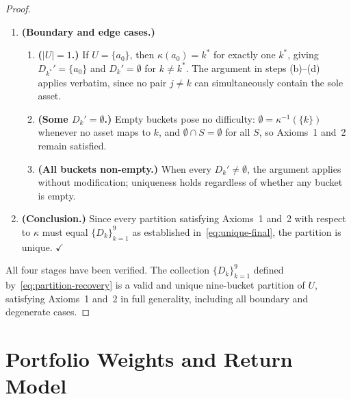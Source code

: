 \documentclass[12pt,openany]{book}
\newcommand{\calU}{\mathcal{U}}
\newcommand{\calD}{\mathcal{D}}
\numberwithin{equation}{chapter}
\theoremstyle{plain}
\theoremstyle{definition}
\theoremstyle{remark}
\def\calU{U}%
\def\calD{D}%
\def\mathcal#1{#1}%
\begin{document}
\begin{proof}
\begin{enumerate}
\begin{enumerate}
    \item \textbf{(Boundary and edge cases.)}
          \begin{enumerate}

            \item \textbf{($|\calU| = 1$.)}
                  If $\calU = \{a_0\}$, then $\kappa(a_0) = k^*$
                  for exactly one $k^*$, giving
                  $\calD_{k^*}' = \{a_0\}$ and
                  $\calD_k' = \emptyset$ for $k \neq k^*$.
                  The argument in steps (b)--(d) applies verbatim,
                  since no pair $j \neq k$ can simultaneously contain
                  the sole asset.

            \item \textbf{(Some $\calD_k' = \emptyset$.)}
                  Empty buckets pose no difficulty:
                  $\emptyset = \kappa^{-1}(\{k\})$ whenever no
                  asset maps to $k$, and
                  $\emptyset \cap S = \emptyset$ for all $S$,
                  so Axioms~1 and~2 remain satisfied.

            \item \textbf{(All buckets non-empty.)}
                  When every $\calD_k' \neq \emptyset$, the argument
                  applies without modification; uniqueness holds
                  regardless of whether any bucket is empty.

          \end{enumerate}

    \item \textbf{(Conclusion.)}
          Since every partition satisfying Axioms~1 and~2
          with respect to $\kappa$ must equal $\{\calD_k\}_{k=1}^9$
          as established in~\eqref{eq:unique-final}, the partition
          is unique. \hfill$\checkmark$

  \end{enumerate}

\end{enumerate}

\noindent
All four stages have been verified. The collection
$\{\calD_k\}_{k=1}^{9}$ defined by~\eqref{eq:partition-recovery}
is a valid and unique nine-bucket partition of $\calU$,
satisfying Axioms~1 and~2 in full generality, including
all boundary and degenerate cases.
\end{proof}

\section{Portfolio Weights and Return Model}
\end{document}
